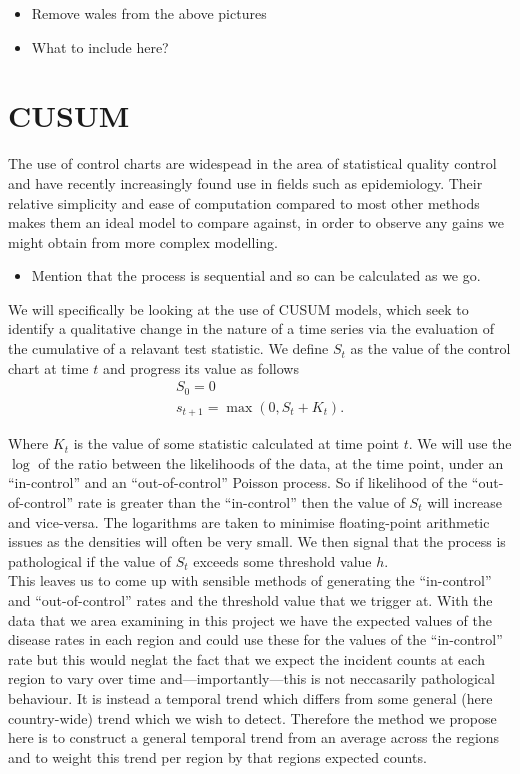 \documentclass{article}
\begin{document}
\begin{itemize}
\item Remove wales from the above pictures
\item What to include here?
\end{itemize}

\section{CUSUM}

The use of control charts are widespead in the area of statistical quality control and have recently increasingly found use in fields such as epidemiology. Their relative simplicity and ease of computation compared to most other methods makes them an ideal model to compare against, in order to observe any gains we might obtain from more complex modelling.

\begin{itemize}
\item Mention that the process is sequential and so can be calculated as we go.
\end{itemize}

We will specifically be looking at the use of CUSUM models, which seek to identify a qualitative change in the nature of a time series via the evaluation of the cumulative of a relavant test statistic. We define $S_t$ as the value of the control chart at time $t$ and progress its value as follows
\begin{gather}
S_0 = 0 \\
s_{t+1} = \max{(0, S_t + K_t)}.
\end{gather}

Where $K_t$ is the value of some statistic calculated at time point $t$. We will use the $\log$ of the ratio between the likelihoods of the data, at the time point, under an ``in-control'' and an ``out-of-control'' Poisson process. So if likelihood of the ``out-of-control'' rate is greater than the ``in-control'' then the value of $S_t$ will increase and vice-versa. The logarithms are taken to minimise floating-point arithmetic issues as the densities will often be very small. We then signal that the process is pathological if the value of $S_t$ exceeds some threshold value $h$. \\

This leaves us to come up with sensible methods of generating the ``in-control'' and ``out-of-control'' rates and the threshold value that we trigger at. With the data that we area examining in this project we have the expected values of the disease rates in each region and could use these for the values of the ``in-control'' rate but this would neglat the fact that we expect the incident counts at each region to vary over time and---importantly---this is not neccasarily pathological behaviour. It is instead a temporal trend which differs from some general (here country-wide) trend which we wish to detect. Therefore the method we propose here is to construct a general temporal trend from an average across the regions and to weight this trend per region by that regions expected counts. \\
\end{document}
